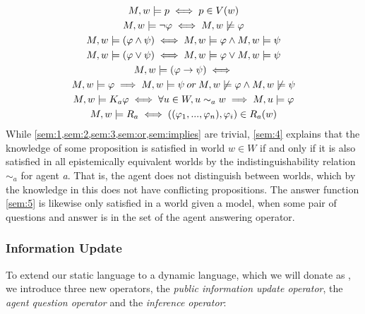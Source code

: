 \begin{gather}
    M, w |= p \iff p \in V(w) \label{sem:1}\\
    M, w |= \neg\varphi \iff M, w \not\models \varphi \label{sem:2}\\
    M, w |= (\varphi \land \psi) \iff M, w |= \varphi \land M, w |= \psi \label{sem:3}\\
    M, w |= (\varphi \lor \psi) \iff M, w |= \varphi \lor M, w |= \psi\label{sem:or}
    \\
    M, w |= \nonumber (\varphi \rightarrow \psi) \iff\\ M, w |= \varphi \implies M, w |= \psi \: or \: M, w \not\models \varphi \land M, w \not\models \psi\label{sem:implies}\\
    M, w |= K_a\varphi \iff \forall u\in W, u \sim_{a} w \implies M, u |= \varphi \label{sem:4} \\
    M, w |= R_a \iff ((\varphi_1,...,\varphi_n), \varphi_i) \in R_a(w) \label{sem:5}
\end{gather}
While \cref{sem:1,sem:2,sem:3,sem:or,sem:implies} are trivial, \cref{sem:4} explains that the knowledge of some proposition \proposition is satisfied in world $w \in W$ if and only if it is also satisfied in all epistemically equivalent worlds by the indistinguishability relation $\sim_a$ for agent \textit{a}. That is, the agent does not distinguish between worlds, which by the knowledge in this does not have conflicting propositions. The answer function \cref{sem:5} is likewise only satisfied in a world given a model, when some pair of questions and answer is in the set of the agent answering operator.

\subsubsection*{Information Update}
To extend our static language \staticlang\: to a dynamic language, which we will donate as \dynlang, we introduce three new operators, the \textit{public information update operator}, the \textit{agent question operator} and the \textit{inference operator}:

